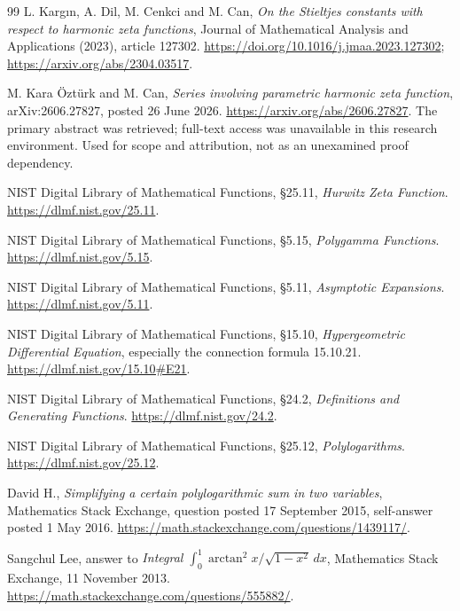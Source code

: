 \documentclass[11pt,a4paper]{article}
\numberwithin{equation}{section}
\theoremstyle{definition}
\theoremstyle{remark}
\begin{document}
\begin{thebibliography}{99}
L. Karg\i n, A. Dil, M. Cenkci and M. Can,
\emph{On the Stieltjes constants with respect to harmonic zeta functions},
Journal of Mathematical Analysis and Applications (2023), article 127302.
\url{https://doi.org/10.1016/j.jmaa.2023.127302};
\url{https://arxiv.org/abs/2304.03517}.

M. Kara \"Ozt\"urk and M. Can,
\emph{Series involving parametric harmonic zeta function},
arXiv:2606.27827, posted 26 June 2026.
\url{https://arxiv.org/abs/2606.27827}.
The primary abstract was retrieved; full-text access was unavailable
in this research environment. Used for scope and attribution, not as
an unexamined proof dependency.

NIST Digital Library of Mathematical Functions,
\S25.11, \emph{Hurwitz Zeta Function}.
\url{https://dlmf.nist.gov/25.11}.

NIST Digital Library of Mathematical Functions,
\S5.15, \emph{Polygamma Functions}.
\url{https://dlmf.nist.gov/5.15}.

NIST Digital Library of Mathematical Functions,
\S5.11, \emph{Asymptotic Expansions}.
\url{https://dlmf.nist.gov/5.11}.

NIST Digital Library of Mathematical Functions,
\S15.10, \emph{Hypergeometric Differential Equation}, especially
the connection formula 15.10.21.
\url{https://dlmf.nist.gov/15.10#E21}.

NIST Digital Library of Mathematical Functions,
\S24.2, \emph{Definitions and Generating Functions}.
\url{https://dlmf.nist.gov/24.2}.

NIST Digital Library of Mathematical Functions,
\S25.12, \emph{Polylogarithms}.
\url{https://dlmf.nist.gov/25.12}.

David H., \emph{Simplifying a certain polylogarithmic sum in two variables},
Mathematics Stack Exchange, question posted 17 September 2015,
self-answer posted 1 May 2016.
\url{https://math.stackexchange.com/questions/1439117/}.

Sangchul Lee, answer to
\emph{Integral $\int_0^1\arctan^2x/\sqrt{1-x^2}\,dx$},
Mathematics Stack Exchange, 11 November 2013.
\url{https://math.stackexchange.com/questions/555882/}.

\end{thebibliography}

\end{document}
